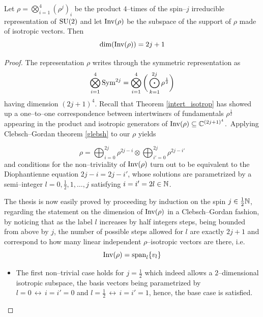\begin{teo}\label{eddy}
Let $\rho=\bigotimes_{i=1}^4(\rho^j)_i$ be the product $4$--times of the spin--$j$ irreducible representation of $\text{\normalfont SU}(2)$ and let $\text{\normalfont Inv}(\rho)$ be the subspace of the support of $\rho$ made of isotropic vectors. Then
    $$\dim(\text{\normalfont Inv}(\rho))=2j+1$$
\end{teo}
\begin{proof}%
The representation $\rho$ writes through the symmetric representation as $$\bigotimes_{i=1}^4\text{\normalfont Sym}^{2j}=\bigotimes_{i=1}^4\bigg(\bigodot_{k=1}^{2j}{\rho^{\frac{1}{2}}}\bigg)$$
having dimension $(2j+1)^4$. Recall that Theorem \ref{intert_isotrop} has showed up a one--to--one correspondence between intertwiners of fundamentals $\rho^{\frac{1}{2}}$ appearing in the product and isotropic generators of $\text{\normalfont Inv}(\rho)\subseteq\mathbb{C}^{(2j+1)^4}$.\, Applying Clebsch--Gordan theorem \ref{glebsh} to our $\rho$ yields

$$\rho=\bigoplus_{i=0}^{2j}\rho^{2j-i}\otimes\bigoplus_{i'=0}^{2j}\rho^{2j-i'}%
$$
and conditions for the non--triviality of $\text{\normalfont Inv}(\rho)$ turn out to be equivalent to the Diophantienne equation $2j-i=2j-i'$, whose solutions are parametrized by a semi--integer $l=0,\frac{1}{2},1,\hdots,j$ satisfying $i=i'=2l\in\mathbb{N}$. 

The thesis is now easily proved by proceeding by induction on the spin $j\in\frac{1}{2}\mathbb{N}$, regarding the statement on the dimension of $\text{\normalfont Inv}(\rho)$ in a Clebsch--Gordan fashion, by noticing that as the label $l$ increases by half integers steps, being bounded from above by $j$, the number of possible steps allowed for $l$ are exactly $2j+1$ and correspond to how many linear independent $\rho$--isotropic vectors are there, i.e. $$\text{\normalfont Inv}(\rho)=\operatorname{span}_l\{v_l\}$$
\begin{itemize}
    \item The first non--trivial case holds for $j=\frac{1}{2}$ which indeed allows a $2$--dimensional isotropic subspace, the basis vectors being parametrized by $l=0\,\leftrightarrow\,i=i'=0$ and $l=\frac{1}{2}\,\leftrightarrow\,i=i'=1$, hence, the base case is satisfied.
    

\end{itemize}
\end{proof}
